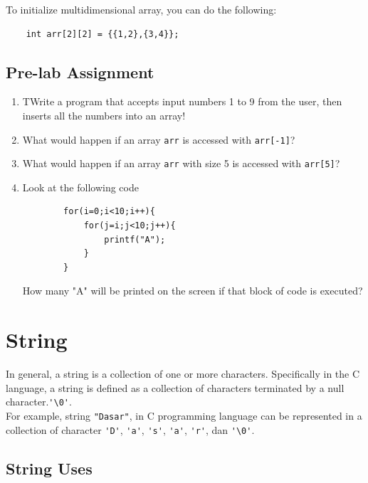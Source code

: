 To initialize multidimensional array, you can do the following:
\begin{verbatim}
    int arr[2][2] = {{1,2},{3,4}};
\end{verbatim}

\subsection{Pre-lab Assignment}
\begin{enumerate}
	\item TWrite a program that accepts input numbers 1 to 9 from the user, then inserts all the numbers into an array!
	\item What would happen if an array \verb|arr| is accessed with \verb|arr[-1]|?
	\item What would happen if an array \verb|arr| with size 5 is accessed with \verb|arr[5]|?
	\item Look at the following code
	      \begin{verbatim}
        for(i=0;i<10;i++){
            for(j=i;j<10;j++){
                printf("A");
            }
        }
    \end{verbatim}
	      How many "A" will be printed on the screen if that block of code is executed?
\end{enumerate}

\section{String}

In general, a string is a collection of one or more characters. Specifically in the C language, a string is defined as a collection of characters terminated by a null character.\verb|'\0'|.
\\
For example, string \verb|"Dasar"|, in C programming language can be represented in a collection of character \verb|'D'|, \verb|'a'|, \verb|'s'|, \verb|'a'|, \verb|'r'|, dan \verb|'\0'|.
\subsection{String Uses}

